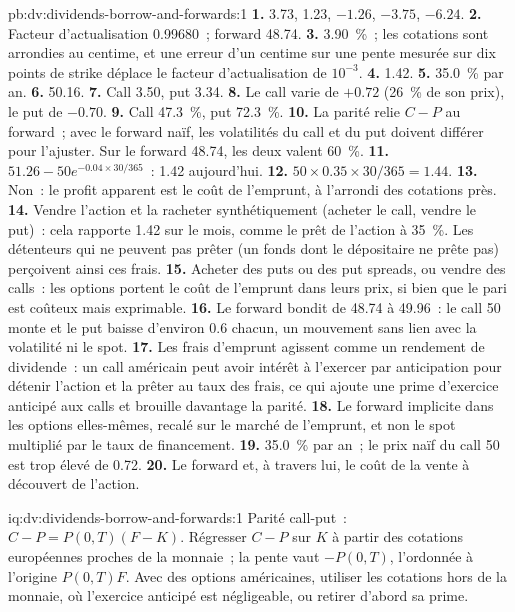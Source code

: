 \begin{solution}{pb:dv:dividends-borrow-and-forwards:1}
\textbf{1.} 3.73, 1.23, $-1.26$, $-3.75$, $-6.24$.
\textbf{2.} Facteur d'actualisation 0.99680~; forward 48.74.
\textbf{3.} 3.90~\%~; les cotations sont arrondies au centime, et une erreur d'un centime sur une pente
mesurée sur dix points de strike déplace le facteur d'actualisation de $10^{-3}$.
\textbf{4.} 1.42.
\textbf{5.} 35.0~\% par an.
\textbf{6.} 50.16.
\textbf{7.} Call 3.50, put 3.34.
\textbf{8.} Le call varie de $+0.72$ (26~\% de son prix), le put de $-0.70$.
\textbf{9.} Call 47.3~\%, put 72.3~\%.
\textbf{10.} La parité relie $C-P$ au forward~; avec le forward naïf, les volatilités du call et du
put doivent différer pour l'ajuster. Sur le forward 48.74, les deux valent 60~\%.
\textbf{11.} $51.26-50e^{-0.04\times30/365}$~: 1.42 aujourd'hui.
\textbf{12.} $50\times0.35\times30/365=1.44$.
\textbf{13.} Non~: le profit apparent est le coût de l'emprunt, à l'arrondi des cotations près.
\textbf{14.} Vendre l'action et la racheter synthétiquement (acheter le call, vendre le put)~:
cela rapporte 1.42 sur le mois, comme le prêt de l'action à 35~\%. Les détenteurs qui
ne peuvent pas prêter (un fonds dont le dépositaire ne prête pas) perçoivent ainsi ces frais.
\textbf{15.} Acheter des puts ou des put spreads, ou vendre des calls~: les options portent le coût de l'emprunt dans
leurs prix, si bien que le pari est coûteux mais exprimable.
\textbf{16.} Le forward bondit de 48.74 à 49.96~: le call 50 monte et le put baisse
d'environ 0.6 chacun, un mouvement sans lien avec la volatilité ni le spot.
\textbf{17.} Les frais d'emprunt agissent comme un rendement de dividende~: un call américain peut avoir intérêt à
l'exercer par anticipation pour détenir l'action et la prêter au taux des frais, ce qui ajoute une
prime d'exercice anticipé aux calls et brouille davantage la parité.
\textbf{18.} Le forward implicite dans les options elles-mêmes, recalé sur le marché de l'emprunt,
et non le spot multiplié par le taux de financement.
\textbf{19.} 35.0~\% par an~; le prix naïf du call 50 est trop élevé de 0.72.
\textbf{20.} Le forward et, à travers lui, le coût de la vente à découvert de l'action.
\end{solution}

\begin{solution}{iq:dv:dividends-borrow-and-forwards:1}
Parité call-put~: $C-P=P(0,T)(F-K)$. Régresser $C-P$ sur $K$ à partir des cotations européennes proches de la
monnaie~; la pente vaut $-P(0,T)$, l'ordonnée à l'origine $P(0,T)F$. Avec des options américaines, utiliser
les cotations hors de la monnaie, où l'exercice anticipé est négligeable, ou retirer d'abord sa prime.
\end{solution}

